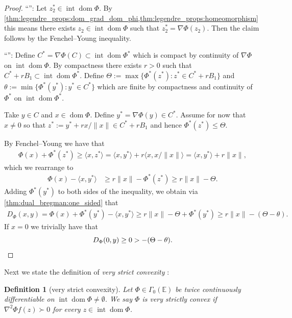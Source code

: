 \documentclass[11pt,onecolumn]{article}
\DeclareMathOperator{\dom}{dom}
\DeclareMathOperator{\intr}{int}
\newtheorem{definition}[definition]{Definition}
\theoremstyle{remark}
\begin{document}
\begin{proof}
``'': Let $z_2^* \in \intr \dom \Phi$. By \cref{thm:legendre_props:dom_grad_dom_phi,thm:legendre_props:homeomorphism} this means there exists $z_2 \in \intr \dom \Phi$ such that $z_2^* = \nabla \Phi(z_2)$. Then the claim follows by the Fenchel--Young inequality.

``'': Define $C^*= \nabla \Phi(C) \subset \intr \dom \Phi^*$ which is compact by continuity of $\nabla \Phi$ on $\intr \dom \Phi$. By compactness there exists $r>0$ such that $C^* + rB_1 \subset \intr \dom \Phi^*$. Define $\Theta:= \max \{ \Phi^*(z^*) : z^* \in C^* + rB_1\}$
and $\theta:= \min \{ \Phi^*(y^*) : y^* \in C^*\}$ which are finite by compactness and continuity of $\Phi^*$ on $\intr \dom \Phi^*$.

Take $y \in C$ and $x \in \dom \Phi$. 
Define $y^*=\nabla \Phi(y) \in C^*$. Assume for now that $x \neq 0$ so that $z^*:=y^* + r x/\|x\| \in C^*+r B_1$ and hence $\Phi^*(z^*) \leq \Theta$.

By Fenchel--Young we have that
\begin{align}
\Phi(x) + \Phi^*(z^*) \geq \langle x, z^*\rangle 
=\langle x, y^*\rangle + r\langle x, x/\|x\|\rangle 
=\langle x, y^*\rangle +r\|x\|,
\end{align}
which we rearrange to
\begin{align}
\Phi(x) -\langle x, y^*\rangle &\geq r\|x\| -  \Phi^*(z^*) \geq r\|x\| -  \Theta.
\end{align}
Adding $\Phi^*(y^*)$ to both sides of the inequality, we obtain via \cref{thm:dual_bregman:one_sided} that
\begin{align}
D_\Phi(x,y)=\Phi(x) +\Phi^*(y^*)-\langle x, y^*\rangle \geq r\|x\| -  \Theta+ \Phi^*(y^*) \geq  r\|x\| -(\Theta - \theta).
\end{align}
If $x=0$ we trivially have that
\[
D_\Phi(0, y)\geq 0 > -(\Theta - \theta). \qedhere
\]
\end{proof}

Next we state the definition of \emph{very strict convexity} \cite[Definition 2.8]{bauschke2000dykstras}:
\begin{definition}[very strict convexity]
Let $\Phi\in \Gamma_0(\mathbb{E})$ be twice continuously differentiable on $\intr\dom\Phi \neq \emptyset$. We say $\Phi$ is \emph{very strictly convex} if $\nabla^2 \Phi f(z) \succ 0$ for every $z \in \intr \dom \Phi$.
\end{definition}
\end{document}
